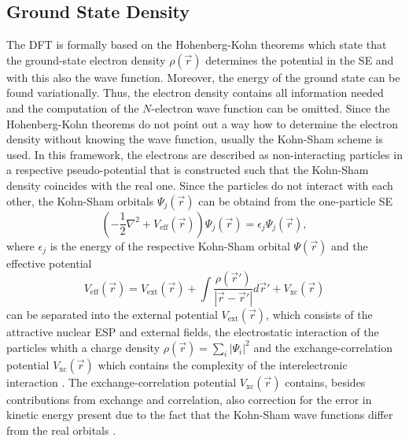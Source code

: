 \subsection{Ground State Density}
\label{ch:dft}
The DFT is formally based on the Hohenberg-Kohn theorems \cite{HohenbergKohn} which state that the ground-state electron density $\rho(\vec{r})$ determines the potential in the SE and with this also the wave function.
Moreover, the energy of the ground state can be found variationally.
Thus, the electron density contains all information needed and the computation of the $N$-electron wave function can be omitted.
Since the Hohenberg-Kohn theorems do not point out a way how to determine the electron density without knowing the wave function, usually the Kohn-Sham scheme \cite{KohnSham} is used.
In this framework, the electrons are described as non-interacting particles in a respective pseudo-potential that is constructed such that the Kohn-Sham density coincides with the real one.
Since the particles do not interact with each other, the Kohn-Sham orbitals $\Psi_j(\vec{r})$ can be obtaind from the one-particle SE
\begin{equation}
\left( -\frac 12  \nabla^2 + V_\text{eff}(\vec{r}) \right) \Psi_j(\vec{r})=\epsilon_j \Psi_j(\vec{r}),
\end{equation}
where $\epsilon_j$ is the energy of the respective Kohn-Sham orbital $\Psi(\vec{r})$ and the effective potential 
\begin{equation} \label{eq:dftPot}
V_\text{eff}(\vec{r})=V_\text{ext}(\vec{r})+ \int \frac{\rho(\vec{r}')}{|\vec{r}-\vec{r}'|} d\vec{r}' + V_\text{xc}(\vec{r})
\end{equation}
can be separated into the external potential $V_\text{ext}(\vec{r})$, which consists of the attractive nuclear ESP and external fields, the electrostatic interaction of the particles whith a charge density $\rho(\vec{r})=\sum_i |\Psi_i|^2$ and the exchange-correlation potential $V_\text{xc}(\vec{r})$ which contains the complexity of the interelectronic interaction \cite{baerRSH}.
The exchange-correlation potential $V_\text{xc}(\vec{r})$ contains, besides contributions from exchange and correlation, also correction for the error in kinetic energy present due to the fact that the Kohn-Sham wave functions differ from the real orbitals \cite{Holthausen}.

